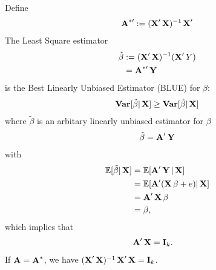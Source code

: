 \documentclass[UTF8,a4paper,10pt]{article}
\begin{document}
\begin{solution}
      Define
      \begin{equation}
        \begin{aligned}
          \A^{*\prime}:= (\X'\X)^{-1}\X'
        \end{aligned}
      \end{equation}
    The Least Square estimator 
      \begin{equation}
        \begin{aligned}
          \hat{\beta} &:= (\X'\X)^{-1}(\X'Y)\\
          &=\A^{*\prime}\Y
        \end{aligned}
      \end{equation}
      is the Best Linearly Unbiased Estimator (BLUE) for \(\beta\):
      \begin{equation}
        \begin{aligned}
          \Var[\tilde{\beta}|\X]\geq\Var[\hat{\beta}|\X]
        \end{aligned}
      \end{equation}
    where \(\tilde{\beta}\) is an arbitary linearly unbiased estimator for \(\beta\)
    \begin{equation}
      \begin{aligned}
        \tilde{\beta}=\A^{\prime}\Y
      \end{aligned}
    \end{equation}
    with
    \begin{equation}
      \begin{aligned}
        \E[\tilde{\beta}|\X]&=\E[\A^{\prime}\Y|\X]\\
        &=\E[\A^{\prime}(\X\beta+e)|\X]\\
        &=\A^{\prime}\X\beta\\
        &=\beta,
      \end{aligned}
    \end{equation}
    which implies that
    \begin{equation}
      \begin{aligned}
        \A^{\prime}\X&=\mathbf{I}_k.
      \end{aligned}
    \end{equation}
    If \(\A = \A^*\), we have \((\X'\X)^{-1}\X'\X = \mathbf{I}_k\).
    

\end{solution}
\end{document}
